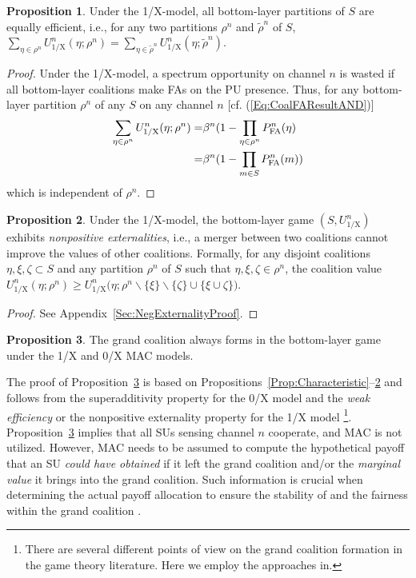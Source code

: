 \documentclass[journal,draftclsnofoot,onecolumn]{IEEEtran}
\theoremstyle{definition}
\newtheorem{Prop}{Proposition}
\begin{document}
\begin{Prop} \label{Prop:EqualEfficient}
Under the 1/X-model, all bottom-layer partitions of $S$ are equally efficient, i.e., for any two partitions $\rho^n$ and $\tilde\rho^n$ of $S$, $\sum\nolimits_{\eta  \in \rho^n } {U_\mathrm{1/X}^n(\eta ;\rho^n)}  = \sum\nolimits_{\eta  \in \tilde\rho^n } {U_\mathrm{1/X}^n(\eta ;\tilde\rho^n )}$.
\end{Prop}
\begin{proof}
Under the 1/X-model, a spectrum opportunity on channel $n$ is wasted if all bottom-layer coalitions make FAs on the PU presence. Thus, for any bottom-layer partition $\rho^n$ of any $S$ on any channel $n$ [cf. (\ref{Eq:CoalFAResultAND})]
\begin{align}
\sum\limits_{\eta  \in \rho^n } {U_\mathrm{1/X}^n(\eta ;\rho^n )}  =& \beta^n(1 - \prod\limits_{\eta  \in \rho^n } {P_{{\mathrm{FA}}}^n(\eta )}\notag\\
=& \beta^n(1 - \prod\limits_{m \in S} {P_{{\mathrm{FA}}}^n(m)}) \label{Eq:EqualEfficientProof}
\end{align}
which is independent of $\rho^n$.
\end{proof}

\begin{Prop} \label{Prop:NegExternality}
Under the 1/X-model, the bottom-layer game $(S,U_\mathrm{1/X}^n)$ exhibits \emph{nonpositive externalities}\cite{Maskin}, i.e., a merger between two coalitions cannot improve the values of other coalitions. Formally, for any disjoint coalitions $\eta ,\xi ,\zeta  \subset S$ and any partition $\rho^n$ of $S$ such that  $\eta ,\xi ,\zeta  \in  \rho^n$, the coalition value
$U_\mathrm{1/X}^n(\eta ;\rho^n )  \geq U_\mathrm{1/X}^n\big(\eta ; \rho^n \backslash \{ \xi\} \backslash \{\zeta \}\cup \{ \xi  \cup \zeta \} \big)$.
\end{Prop}
\begin{proof}
See Appendix~\ref{Sec:NegExternalityProof}.
\end{proof}

\begin{Prop}\label{Prop:GrandCoalFormation}
The grand coalition always forms in the bottom-layer game under the 1/X and 0/X MAC models.
\end{Prop}
The proof of Proposition~\ref{Prop:GrandCoalFormation} is based on Propositions~\ref{Prop:Characteristic}--\ref{Prop:NegExternality} and follows from the superadditivity property \cite{CoalGameSurvey} for the 0/X model and the \emph{weak efficiency} or the nonpositive externality property \cite{Maskin, Efficiency} for the 1/X model \cite{YLuCISS}\footnote{There are several different points of view on the grand coalition formation in the game theory literature. Here we employ the approaches in\cite{CoalGameSurvey,Maskin, Efficiency}.}. Proposition~\ref{Prop:GrandCoalFormation} implies that all SUs sensing channel $n$ cooperate, and MAC is not utilized. However, MAC needs to be assumed to compute the hypothetical payoff that an SU \emph{could have obtained} if it left the grand coalition and/or the \emph{marginal value} it brings into the grand coalition. Such information is crucial when determining the actual payoff allocation to ensure the stability of and the fairness within the grand coalition \cite{GameSurvey}.
\end{document}

